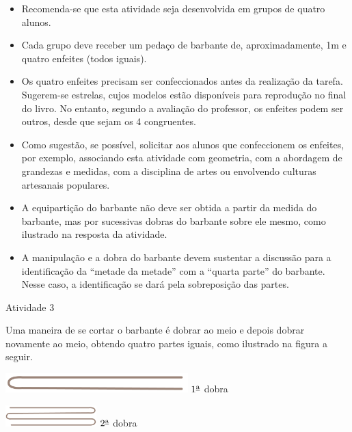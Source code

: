 \begin{multicols}{2}
\begin{itemize} %
    \item       Recomenda-se que esta atividade seja desenvolvida em grupos de quatro alunos.
    \item       Cada grupo deve receber um pedaço de barbante de, aproximadamente, 1m e quatro enfeites (todos iguais).
    \item       Os quatro enfeites precisam ser confeccionados antes da realização da tarefa. Sugerem-se estrelas, cujos modelos estão disponíveis para reprodução no final do livro. No entanto, segundo a avaliação do professor, os enfeites podem ser outros, desde que sejam os 4 congruentes.
    \item       Como sugestão, se possível, solicitar aos alunos que confeccionem os enfeites, por exemplo, associando esta atividade com geometria, com a abordagem de grandezas e medidas, com a disciplina de artes ou envolvendo culturas artesanais populares.
    \item       A equipartição do barbante não deve ser obtida a partir da medida do barbante, mas por sucessivas dobras do barbante sobre ele mesmo, como ilustrado na resposta da atividade.
    \item       A manipulação e a dobra do barbante devem sustentar a discussão para a identificação da       ``metade da metade''       com a       ``quarta parte''       do barbante. Nesse caso, a identificação se dará pela sobreposição das partes.
\end{itemize} %


\begin{resposta*}{Atividade 3}

Uma maneira de se cortar o barbante é dobrar ao meio e depois dobrar novamente ao meio, obtendo quatro partes iguais, como ilustrado na figura a seguir.
  \begin{center}
  \includegraphics[width=200pt, keepaspectratio]{..//media/cap1/secoes/pngs_licao_01/ativ3_fig03a.png}\newline
  $1^{\textrm{\underline{a}}}$ dobra
  
  \includegraphics[width=100pt, keepaspectratio]{..//media/cap1/secoes/pngs_licao_01/ativ3_fig03b.png}\newline
  $2^{\textrm{\underline{a}}}$ dobra
  \end{center}
\end{resposta*}



\end{multicols}
